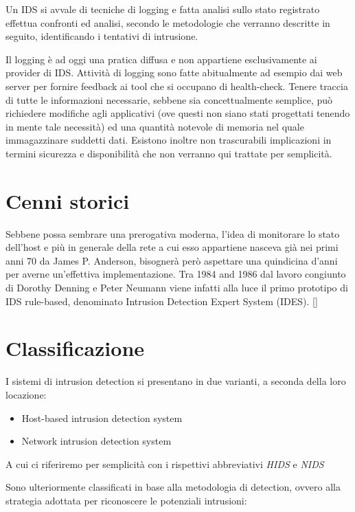 \documentclass{ldr-article}
\begin{document}
Un IDS si avvale di tecniche di logging e fatta analisi sullo stato registrato effettua confronti ed analisi, secondo le metodologie che verranno descritte in seguito, identificando i tentativi di intrusione.

Il logging è ad oggi una pratica diffusa e non appartiene esclusivamente ai provider di IDS. Attività di logging sono fatte abitualmente ad esempio dai web server per fornire feedback ai tool che si occupano di health-check. Tenere traccia di tutte le informazioni necessarie, sebbene sia concettualmente semplice, può richiedere modifiche agli applicativi (ove questi non siano stati progettati tenendo in mente tale necessità) ed una quantità notevole di memoria nel quale immagazzinare suddetti dati. Esistono inoltre non trascurabili implicazioni in termini sicurezza e disponibilità che non verranno qui trattate per semplicità.

\section{Cenni storici}

Sebbene possa sembrare una prerogativa moderna, l'idea di monitorare lo stato dell'host e più in generale della rete a cui esso appartiene nasceva già nei primi anni 70 da James P. Anderson, bisognerà però aspettare una quindicina d'anni per averne un'effettiva implementazione. Tra 1984 and 1986 dal lavoro congiunto di Dorothy Denning e Peter Neumann viene infatti alla luce il primo prototipo di IDS rule-based, denominato Intrusion Detection
Expert System (IDES). [\cite{ids-history}]

\section{Classificazione}
I sistemi di intrusion detection si presentano in due varianti, a seconda della loro locazione:

\begin{itemize}
  \item Host-based intrusion detection system
  \item Network intrusion detection system
\end{itemize}

A cui ci riferiremo per semplicità con i rispettivi abbreviativi \textit{HIDS} e \textit{NIDS}

Sono ulteriormente classificati in base alla metodologia di detection, ovvero alla strategia adottata per riconoscere le potenziali intrusioni:
\end{document}
